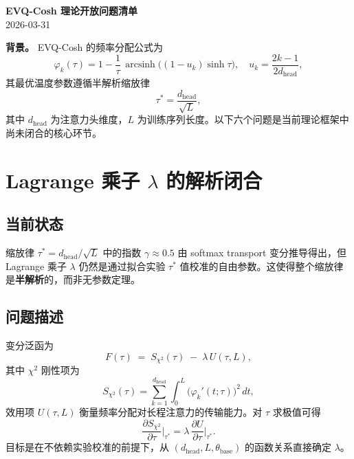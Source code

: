 \documentclass[11pt,a4paper]{article}
\newcommand{\zh}[1]{{\zhfont #1}}
\begin{document}
\begin{center}
{\LARGE\bfseries EVQ-Cosh \zh{理论开放问题清单}}\\[4pt]
{\normalsize 2026-03-31}
\end{center}

\vspace{6pt}
\noindent\textbf{\zh{背景。}}\quad
EVQ-Cosh \zh{的频率分配公式为}
\begin{equation}
  \varphi_k(\tau) = 1 - \frac{1}{\tau}\,\operatorname{arcsinh}\!\bigl((1-u_k)\sinh\tau\bigr),
  \quad u_k = \frac{2k-1}{2d_{\mathrm{head}}},
  \label{eq:evq}
\end{equation}
\zh{其最优温度参数遵循半解析缩放律}
\begin{equation}
  \tau^* = \frac{d_{\mathrm{head}}}{\sqrt{L}},
  \label{eq:tau-star}
\end{equation}
\zh{其中} $d_{\mathrm{head}}$ \zh{为注意力头维度，}$L$ \zh{为训练序列长度。以下六个问题是当前理论框架中尚未闭合的核心环节。}

\vspace{12pt}

\section{Lagrange \zh{乘子} $\lambda$ \zh{的解析闭合}}

\subsection*{\zh{当前状态}}
\zh{缩放律} $\tau^* = d_{\mathrm{head}}/\sqrt{L}$ \zh{中的指数} $\gamma \approx 0.5$ \zh{由} softmax transport \zh{变分推导得出，但} Lagrange \zh{乘子} $\lambda$ \zh{仍然是通过拟合实验} $\tau^*$ \zh{值校准的自由参数。这使得整个缩放律是\textbf{半解析}的，而非无参数定理。}

\subsection*{\zh{问题描述}}
\zh{变分泛函为}
\begin{equation}
  F(\tau) \;=\; S_{\chi^2}(\tau) \;-\; \lambda\,U(\tau, L),
  \label{eq:variational}
\end{equation}
\zh{其中} $\chi^2$ \zh{刚性项为}
\begin{equation}
  S_{\chi^2}(\tau) = \sum_{k=1}^{d_{\mathrm{head}}}
  \int_0^{L} \bigl(\varphi_k'(t;\tau)\bigr)^2\,dt,
\end{equation}
\zh{效用项} $U(\tau, L)$ \zh{衡量频率分配对长程注意力的传输能力。对} $\tau$ \zh{求极值可得}
\begin{equation}
  \frac{\partial S_{\chi^2}}{\partial \tau}\bigg|_{\tau^*}
  = \lambda \,\frac{\partial U}{\partial \tau}\bigg|_{\tau^*}.
\end{equation}
\zh{目标是在不依赖实验校准的前提下，从} $(d_{\mathrm{head}}, L, \theta_{\mathrm{base}})$ \zh{的函数关系直接确定} $\lambda$\zh{。}
\end{document}

